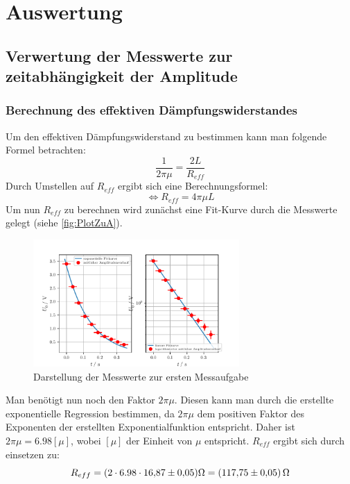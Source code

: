 \section{Auswertung}
\label{sec:Auswertung}
\subsection{Verwertung der Messwerte zur zeitabhängigkeit der Amplitude}
\label{subsec:AuswertungA}
\subsubsection{Berechnung des effektiven Dämpfungswiderstandes}
\label{subsubsec:Erste Rechnung}
Um den effektiven Dämpfungswiderstand zu bestimmen kann man folgende Formel betrachten: 
\begin{equation}
  \label{eqn:Abklingdauer}
  \frac{1}{2\pi\mu} = \frac{2L}{R_{eff}}
\end{equation}
Durch Umstellen auf $R_{eff}$ ergibt sich eine Berechnungsformel:
\begin{equation}
  \label{Abklingdauer1}
  \Longleftrightarrow R_{eff} = 4\pi\mu L
\end{equation}
Um nun $R_{eff}$ zu berechnen wird zunächst eine Fit-Kurve durch die Messwerte gelegt (siehe \autoref{fig:PlotZuA}).
\begin{figure}
  \centering
  \includegraphics[width=0.7\textwidth]{PlotZuA.pdf}
  \caption{Darstellung der Messwerte zur ersten Messaufgabe}
  \label{fig:PlotZuA}
\end{figure}
Man benötigt nun noch den Faktor $2\pi\mu$. Diesen kann man durch die erstellte exponentielle Regression 
bestimmen, da $2\pi\mu$ dem positiven Faktor des Exponenten der erstellten Exponentialfunktion entspricht. 
Daher ist $2\pi\mu = 6.98[\mu]$, wobei $[\mu]$ der Einheit von $\mu$ entspricht. 
$R_{eff}$ ergibt sich durch einsetzen zu:
\begin{equation*}
  R_{eff} = (2\cdot 6.98\cdot \num{16.87\pm 0.05}) \unit{\ohm} = (\num{117.75 \pm 0.05})\,\unit{\ohm}
\end{equation*}


